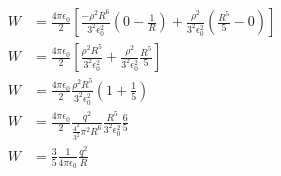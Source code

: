\documentclass{article}
\begin{document}
\begin{align*}
	W & = \frac{4 \pi \epsilon_0}{2} \left[\frac{-\rho ^2 R^6}{3^2 \epsilon_0^2} (0 - \frac{1}{R}) + \frac{\rho^2}{3^2 \epsilon_0^2} \left( \frac{R^5}{5} -0\right)  \right]                                      \\
	W & = \frac{4 \pi \epsilon_0}{2} \left[ \frac{\rho ^2 R^5}{3^2 \epsilon_0^2} + \frac{\rho^2}{3^2 \epsilon_0^2} \frac{R^5}{5}\right]                                                                           \\
	W & = \frac{4 \pi \epsilon_0}{2} \frac{\rho^2 R^5}{3^2 \epsilon_0^2} \left(1 + \frac{1}{5}\right)                                                                                                             \\
	W & = \frac{4 \pi \epsilon_0}{2} \frac{q^2}{\frac{4^2}{3^2} \pi^2 R^6} \frac{R^5}{3^2 \epsilon_0^2} \frac{6}{5}                                                                                               \\
	W & = \frac{3}{5} \frac{1}{4 \pi \epsilon_0} \frac{q^2}{R}
\end{align*}
\end{document}
